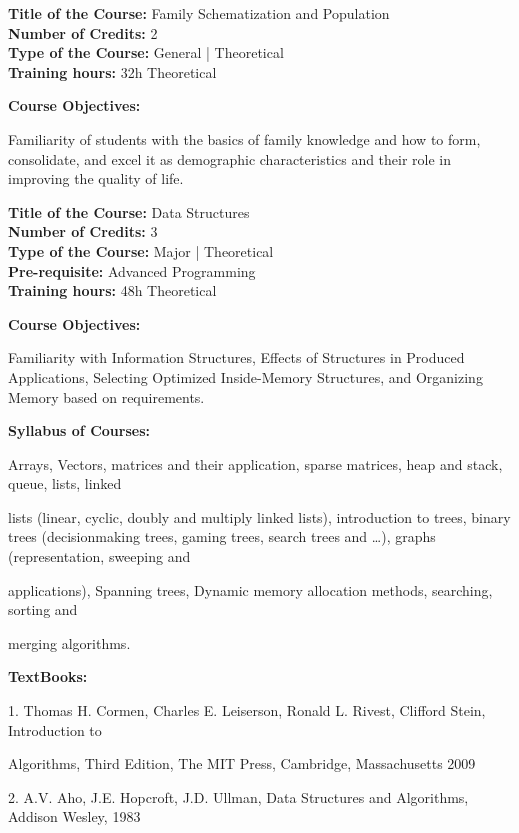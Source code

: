 \documentclass[12pt,a4paper]{article}
\begin{document}
\par\vspace{14pt}
\nopagebreak
\textbf{Title of the Course:} Family Schematization and Population\\
\textbf{Number of Credits:} 2\\
\textbf{Type of the Course:} General | Theoretical\\
\textbf{Training hours:} 32h Theoretical\par\vspace{4pt}
\textbf{Course Objectives:}\par\vspace{2pt}
Familiarity of students with the basics of family knowledge and how to form, consolidate, and
excel it as demographic characteristics and their role in improving the quality of life.\par\vspace{4pt}

\newpage
\textbf{Title of the Course:} Data Structures\\
\textbf{Number of Credits:} 3\\
\textbf{Type of the Course:} Major | Theoretical\\
\textbf{Pre-requisite:} Advanced Programming\\
\textbf{Training hours:} 48h Theoretical\par\vspace{4pt}
\textbf{Course Objectives:}\par\vspace{2pt}
Familiarity with Information Structures, Effects of Structures in Produced Applications, Selecting
Optimized Inside-Memory Structures, and Organizing Memory based on requirements.\par\vspace{4pt}
\textbf{Syllabus of Courses:}\par\vspace{2pt}
Arrays, Vectors, matrices and their application, sparse matrices, heap and stack, queue, lists, linked\par
lists (linear, cyclic, doubly and multiply linked lists), introduction to trees, binary trees (decisionmaking trees, gaming trees, search trees and …), graphs (representation, sweeping and\par
applications), Spanning trees, Dynamic memory allocation methods, searching, sorting and\par
merging algorithms.\par\vspace{4pt}
\textbf{TextBooks:}\par\vspace{2pt}
1. Thomas H. Cormen, Charles E. Leiserson, Ronald L. Rivest, Clifford Stein, Introduction to\par
Algorithms, Third Edition, The MIT Press, Cambridge, Massachusetts 2009\par
2. A.V. Aho, J.E. Hopcroft, J.D. Ullman, Data Structures and Algorithms, Addison Wesley, 1983\par
\vspace{4pt}
\end{document}
